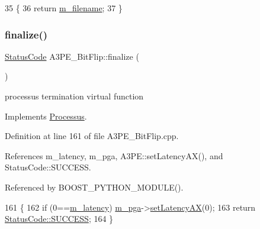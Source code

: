 \begin{DoxyCode}
35                   \{
36     \textcolor{keywordflow}{return} \hyperlink{classA3PE__BitFlip_a72eecaff11d66c7f3eee10a9b2bfa301}{m\_filename};
37   \}
\end{DoxyCode}
\mbox{\label{classA3PE__BitFlip_ab40772a001613a0e1932d1e356ccf717}} 
\subsubsection{\texorpdfstring{finalize()}{finalize()}}
{\footnotesize\ttfamily \hyperlink{classStatusCode}{Status\+Code} A3\+P\+E\+\_\+\+Bit\+Flip\+::finalize (\begin{DoxyParamCaption}{ }\end{DoxyParamCaption})\hspace{0.3cm}{\ttfamily [virtual]}}

processus termination virtual function 

Implements \hyperlink{classProcessus_aba93d691f031bdb18ae4b8afb1b2e856}{Processus}.



Definition at line 161 of file A3\+P\+E\+\_\+\+Bit\+Flip.\+cpp.



References m\+\_\+latency, m\+\_\+pga, A3\+P\+E\+::set\+Latency\+A\+X(), and Status\+Code\+::\+S\+U\+C\+C\+E\+SS.



Referenced by B\+O\+O\+S\+T\+\_\+\+P\+Y\+T\+H\+O\+N\+\_\+\+M\+O\+D\+U\+L\+E().


\begin{DoxyCode}
161                                     \{
162   \textcolor{keywordflow}{if} (0==\hyperlink{classA3PE__BitFlip_a6f5ad1d6595e98c2fbd58f43e2754322}{m\_latency}) \hyperlink{classA3PE__BitFlip_ad20d7abccf27fa87b931cb77cd6b5e41}{m\_pga}->\hyperlink{classA3PE_a53882e1272e8146e51837904ea00f33c}{setLatencyAX}(0);
163   \textcolor{keywordflow}{return} \hyperlink{classStatusCode_a6f565cbeadc76d14c72f047e5e85eb4badd0da38d3ba0d922efd1f4619bc37ad8}{StatusCode::SUCCESS};
164 \}
\end{DoxyCode}
\mbox{\label{classProcessus_a409227db936baff03c0462c1bcfe8069}} 
